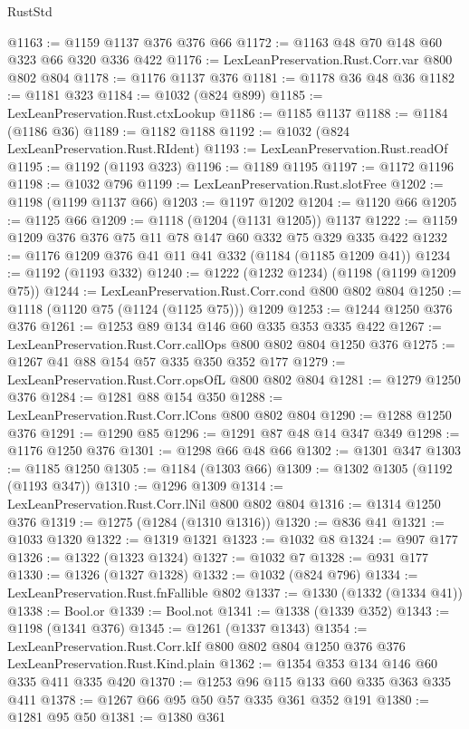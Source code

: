 \begin{lexlean}{RustStd}
\begin{coremodule}
@1163 := @1159 @1137 @376 @376 @66
@1172 := @1163 @48 @70 @148 @60 @323 @66 @320 @336 @422
@1176 := LexLeanPreservation.Rust.Corr.var @800 @802 @804
@1178 := @1176 @1137 @376
@1181 := @1178 @36 @48 @36
@1182 := @1181 @323
@1184 := @1032 (@824 @899)
@1185 := LexLeanPreservation.Rust.ctxLookup
@1186 := @1185 @1137
@1188 := @1184 (@1186 @36)
@1189 := @1182 @1188
@1192 := @1032 (@824 LexLeanPreservation.Rust.RIdent)
@1193 := LexLeanPreservation.Rust.readOf
@1195 := @1192 (@1193 @323)
@1196 := @1189 @1195
@1197 := @1172 @1196
@1198 := @1032 @796
@1199 := LexLeanPreservation.Rust.slotFree
@1202 := @1198 (@1199 @1137 @66)
@1203 := @1197 @1202
@1204 := @1120 @66
@1205 := @1125 @66
@1209 := @1118 (@1204 (@1131 @1205)) @1137
@1222 := @1159 @1209 @376 @376 @75 @11 @78 @147 @60 @332 @75 @329 @335 @422
@1232 := @1176 @1209 @376 @41 @11 @41 @332 (@1184 (@1185 @1209 @41))
@1234 := @1192 (@1193 @332)
@1240 := @1222 (@1232 @1234) (@1198 (@1199 @1209 @75))
@1244 := LexLeanPreservation.Rust.Corr.cond @800 @802 @804
@1250 := @1118 (@1120 @75 (@1124 (@1125 @75))) @1209
@1253 := @1244 @1250 @376 @376
@1261 := @1253 @89 @134 @146 @60 @335 @353 @335 @422
@1267 := LexLeanPreservation.Rust.Corr.callOps @800 @802 @804 @1250 @376
@1275 := @1267 @41 @88 @154 @57 @335 @350 @352 @177
@1279 := LexLeanPreservation.Rust.Corr.opsOfL @800 @802 @804
@1281 := @1279 @1250 @376
@1284 := @1281 @88 @154 @350
@1288 := LexLeanPreservation.Rust.Corr.lCons @800 @802 @804
@1290 := @1288 @1250 @376
@1291 := @1290 @85
@1296 := @1291 @87 @48 @14 @347 @349
@1298 := @1176 @1250 @376
@1301 := @1298 @66 @48 @66
@1302 := @1301 @347
@1303 := @1185 @1250
@1305 := @1184 (@1303 @66)
@1309 := @1302 @1305 (@1192 (@1193 @347))
@1310 := @1296 @1309
@1314 := LexLeanPreservation.Rust.Corr.lNil @800 @802 @804
@1316 := @1314 @1250 @376
@1319 := @1275 (@1284 (@1310 @1316))
@1320 := @836 @41
@1321 := @1033 @1320
@1322 := @1319 @1321
@1323 := @1032 @8
@1324 := @907 @177
@1326 := @1322 (@1323 @1324)
@1327 := @1032 @7
@1328 := @931 @177
@1330 := @1326 (@1327 @1328)
@1332 := @1032 (@824 @796)
@1334 := LexLeanPreservation.Rust.fnFallible @802
@1337 := @1330 (@1332 (@1334 @41))
@1338 := Bool.or
@1339 := Bool.not
@1341 := @1338 (@1339 @352)
@1343 := @1198 (@1341 @376)
@1345 := @1261 (@1337 @1343)
@1354 := LexLeanPreservation.Rust.Corr.kIf
    @800
    @802
    @804
    @1250
    @376
    @376
    LexLeanPreservation.Rust.Kind.plain
@1362 := @1354 @353 @134 @146 @60 @335 @411 @335 @420
@1370 := @1253 @96 @115 @133 @60 @335 @363 @335 @411
@1378 := @1267 @66 @95 @50 @57 @335 @361 @352 @191
@1380 := @1281 @95 @50
@1381 := @1380 @361

\end{coremodule}
\end{lexlean}
